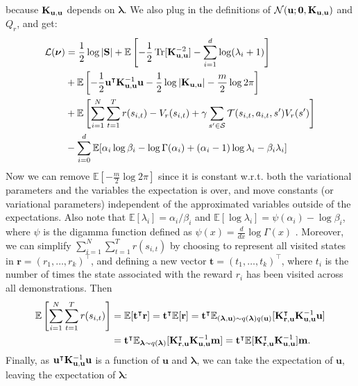 \documentclass{mprop}
\theoremstyle{definition}
\DeclareMathOperator{\Tr}{Tr}
\begin{document}
because $\mathbf{K}_{\mathbf{u},\mathbf{u}}$ depends on $\bm\lambda$. We also plug in the definitions of
$\mathcal{N}(\mathbf{u}; \mathbf{0}, \mathbf{K}_{\mathbf{u},\mathbf{u}})$ and $Q_r$, and get:
\begin{align*}
  \mathcal{L}(\bm\nu) &= \frac{1}{2}\log|\mathbf{S}| + \mathbb{E}\left[-\frac{1}{2}\Tr[\Kuu^{-2}] - \sum_{i=1}^d \log(\lambda_i + 1)\right] \\
  &+ \mathbb{E}\left[-\frac{1}{2}\mathbf{u}^\intercal\Kuu^{-1}\mathbf{u} -
    \frac{1}{2}\log|\Kuu| - \frac{m}{2}\log 2\pi\right] \\
  &+ \mathbb{E}\left[\sum_{i=1}^N \sum_{t=1}^T r(s_{i,t}) - V_r(s_{i,t}) + \gamma\sum_{s' \in \mathcal{S}}
    \mathcal{T}(s_{i,t}, a_{i,t}, s')V_r(s') \right] \\
  &- \sum_{i=0}^d \mathbb{E}[\alpha_i\log\beta_i - \log\Gamma(\alpha_i) + (\alpha_i - 1)\log\lambda_i - \beta_i\lambda_i]
\end{align*}
Now we can remove $\mathbb{E}\left[-\frac{m}{2}\log2\pi\right]$ since it is
constant w.r.t. both the variational parameters and the variables the
expectation is over, and move constants (or variational parameters) independent
of the approximated variables outside of the expectations. Also note that
$\mathbb{E}[\lambda_i] = \alpha_i/\beta_i$ and
$\mathbb{E}[\log \lambda_i] = \psi(\alpha_i) - \log\beta_i$, where $\psi$ is the
digamma function defined as $\psi(x) = \frac{d}{dx}\log\Gamma(x)$
\cite{DBLP:books/lib/Bishop07}. Moreover, we can simplify
$\sum_{i=1}^N\sum_{t=1}^Tr(s_{i,t})$ by choosing to represent all visited states
in $\mathbf{r} = (r_1, \dots, r_k)^\intercal$, and defining a new vector
$\mathbf{t} = (t_1, \dots, t_k)^\intercal$, where $t_i$ is the number of times
the state associated with the reward $r_i$ has been visited across all
demonstrations. Then
\begin{align*}
\mathbb{E} \left[ \sum_{i=1}^N\sum_{t=1}^Tr(s_{i,t}) \right] &=
    \mathbb{E}[\mathbf{t}^\intercal\mathbf{r}] =
    \mathbf{t}^\intercal\mathbb{E}[\mathbf{r}] =
    \mathbf{t}^\intercal\mathbb{E}_{(\bm\lambda, \mathbf{u}) \sim
  q(\bm\lambda)q(\mathbf{u})}[\mathbf{K}_{\mathbf{r},\mathbf{u}}^\intercal\mathbf{K}_{\mathbf{u},\mathbf{u}}^{-1}\mathbf{u}] \\
  &= \mathbf{t}^\intercal\mathbb{E}_{\bm\lambda \sim q(\bm\lambda)}[\mathbf{K}_{\mathbf{r},\mathbf{u}}^\intercal\mathbf{K}_{\mathbf{u},\mathbf{u}}^{-1}\mathbf{m}] = \mathbf{t}^\intercal\mathbb{E}[\mathbf{K}_{\mathbf{r},\mathbf{u}}^\intercal\mathbf{K}_{\mathbf{u},\mathbf{u}}^{-1}]\mathbf{m}.
\end{align*}
Finally, as $\mathbf{u}^\intercal\mathbf{K}_{\mathbf{u},\mathbf{u}}^{-1}\mathbf{u}$ is a function of
$\mathbf{u}$ and $\bm\lambda$, we can take the expectation of $\mathbf{u}$, leaving
the expectation of $\bm\lambda$:
\end{document}
